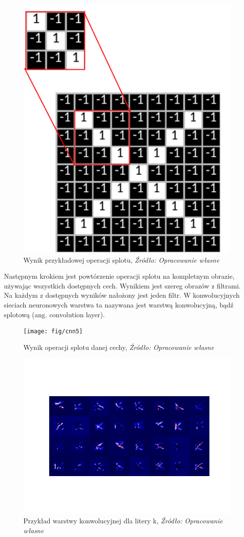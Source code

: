 \documentclass[brudnopis]{xmgr}
\begin{document}
\begin{figure}[!tbh]
\centering
\includegraphics[width=.5\hsize]{fig/cnn4}
\caption{Wynik przykładowej operacji splotu, \emph{Źródło: Opracowanie własne}}
\end{figure}

Następnym krokiem jest powtórzenie operacji splotu na kompletnym obrazie, używając wszystkich dostępnych cech. Wynikiem jest szereg obrazów z filtrami. Na każdym z dostępnych wyników nałożony jest jeden filtr. W konwolucyjnych sieciach neuronowych warstwa ta nazywana jest warstwą konwolucyjną, bądź splotową (ang. convolution layer).

\begin{figure}[!tbh]
\centering
\texttt{[image: fig/cnn5]}
\caption{Wynik operacji splotu danej cechy, \emph{Źródło: Opracowanie własne}}
\end{figure}
\newpage


\begin{figure}[!tbh]
\centering
\includegraphics[width=.7\hsize]{fig/figure_1}
\caption{Przykład warstwy konwolucyjnej dla litery k, \emph{Źródło: Opracowanie własne}}
\end{figure}
\end{document}
